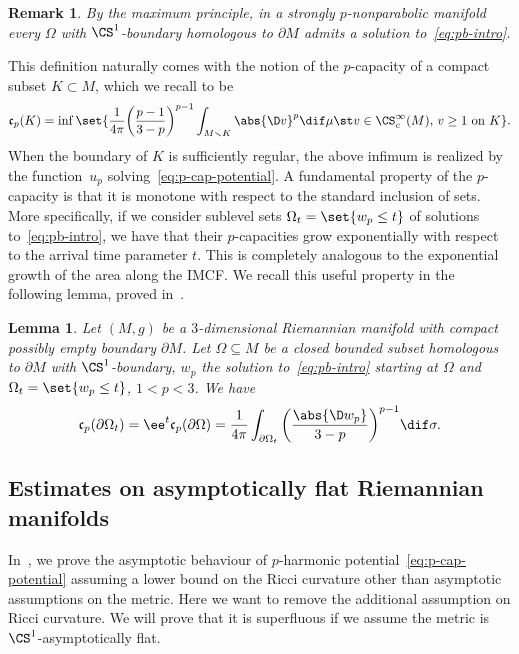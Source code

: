\documentclass[10pt,a4paper]{amsart}
\numberwithin{equation}{section}
\newtheorem{Lemma}[Theorem]{Lemma}
\newtheorem{Remark}[Theorem]{Remark} }
\renewcommand{\ncapa}{\mathfrak{c}}
\begin{document}
\begin{Remark}
By the maximum principle, in a strongly $p$-nonparabolic manifold every $\Omega$ with $\CS^{1}$-boundary homologous to $\partial M$ admits a solution to~\eqref{eq:pb-intro}.
\end{Remark}

This definition naturally comes with the notion of the $p$-capacity of a compact subset $K \subset M$, which we recall to be
\begin{equation*}%
 \ncapa_p(K) = \inf \set{\frac{1}{4\pi}\bigg(\frac{p-1}{3-p}\bigg)^{p-1}\int_{M\smallsetminus K} \abs{\D v}^p \dif \mu\st v \in \CS_c^\infty(M),\, v \geq 1\text{ on } K}.
\end{equation*}
When the boundary of $K$ is sufficiently regular, the above infimum is realized by the function~$u_p$ solving~\eqref{eq:p-cap-potential}. A fundamental property of the $p$-capacity is that it is monotone with respect to the standard inclusion of sets. More specifically, if we consider sublevel sets $\Omega_t=\set{w_p \leq t}$ of solutions to~\eqref{eq:pb-intro}, we have that their $p$-capacities grow exponentially with respect to the arrival time parameter $t$. This is
completely analogous to the exponential growth of the area along the IMCF. We recall this useful property in the following lemma, proved in~\cite[Lemma~3.8]{holopainen_nonlinearpotentialtheoryquasiregular_1990}.

\begin{Lemma}
Let $(M,g)$ be a $3$-dimensional Riemannian manifold with compact possibly empty boundary $\partial M$. Let $\Omega\subseteq M$ be a closed bounded subset homologous to $\partial M$ with $\CS^1$-boundary, $w_p$ the solution to~\eqref{eq:pb-intro} starting at $\Omega$ and $\Omega_t= \set{w_p \leq t}$, $1<p<3$. We have
\[
 \ncapa_p(\partial \Omega_t) = \ee^{t} \ncapa_p(\partial \Omega)= \frac{1}{4\pi}\int_{\partial \Omega_t} \bigg(\frac{ \abs{ \D w_p}}{3-p}\bigg)^{p-1}\dif \sigma.
\]
\end{Lemma}

\subsection{Estimates on asymptotically flat Riemannian manifolds}
In~\cite{benatti_asymptoticbehaviourcapacitarypotentials_2022}, we prove the asymptotic behaviour of $p$-harmonic potential~\eqref{eq:p-cap-potential} assuming a lower bound on the Ricci curvature other than asymptotic assumptions on the metric. Here we want to remove the additional assumption on Ricci curvature. We will prove that it is superfluous if we assume the metric is $\CS^1$-asymptotically flat.
\end{document}

